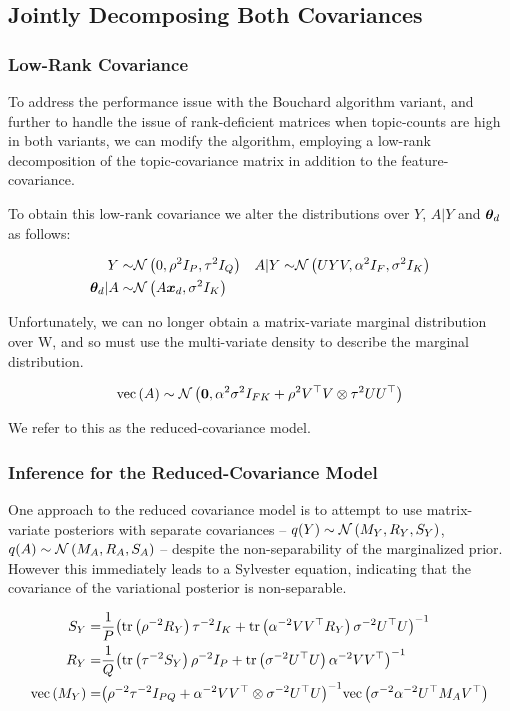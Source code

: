 

\newcommand \Vd[0] { { V^{(d)} } }

\subsection{Jointly Decomposing Both Covariances}
\subsubsection{Low-Rank Covariance}
To address the performance issue with the Bouchard algorithm variant, and further to handle the issue of rank-deficient matrices when topic-counts are high in both variants, we can modify the algorithm, employing a low-rank decomposition of the topic-covariance matrix in addition to the feature-covariance.

To obtain this low-rank covariance we alter the distributions over $Y$, $A|Y$ and ${ \bm \theta_d }$ as follows:

\begin{align}
Y \sim & \mathcal{N} \left(0, \rho^2 I_P, \tau^2 I_Q\right) & A|Y \sim & \mathcal{N} \left(UYV, \alpha^2 I_F, \sigma^2 I_K\right) \\
{ \bm \theta_d } | A \sim & \mathcal{N} \left( {A\bm x_d}, {\sigma^2 I_K} \right)
\end{align}

Unfortunately, we can no longer obtain a matrix-variate marginal distribution over W, and so must use the multi-variate density to describe the marginal distribution.  


\begin{align}
\text{vec}\left(A\right) \sim \mathcal{N} \left( {\bm 0}, {\alpha^2 \sigma^2 I_{FK} + \rho^2 V^\top V \otimes \tau^2 U U ^\top} \right)
\end{align}

We refer to this as the reduced-covariance model.

\subsubsection{Inference for the Reduced-Covariance Model}
One approach to the reduced covariance model is to attempt to use matrix-variate posteriors with separate covariances -- $q(Y) \sim \mathcal{N} \left(M_Y, R_Y, S_Y\right)$, $q(A) \sim \mathcal{N} \left(M_A, R_A, S_A\right)$ --  despite the non-separability of the marginalized prior. However this immediately leads to a Sylvester equation, indicating that the covariance of the variational posterior is non-separable.

\begin{align}
S_Y = & \frac{1}{P}{\left( \text{tr} \left( {\rho^{-2} R_Y} \right)\tau^{-2}I_K + \text{tr} \left( {\alpha^{-2}V V^\top R_Y} \right) \sigma^{-2}U^\top U  \right)}^{-1} \\
R_Y = & \frac{1}{Q}{\left( \text{tr} \left( {\tau^{-2} S_Y} \right)\rho^{-2}I_P + \text{tr} \left( {\sigma^{-2} U^\top U} \right) \alpha^{-2} V V^\top \right)}^{-1} \\
\text{vec}\left(M_Y\right) = & {\left( \rho^{-2}\tau^{-2} I_{PQ} + \alpha^{-2}V V^\top \otimes \sigma^{-2} U ^\top U \right)}^{-1}\text{vec}\left(\sigma^{-2}\alpha^{-2} U^\top M_A V^\top\right)
\end{align}

